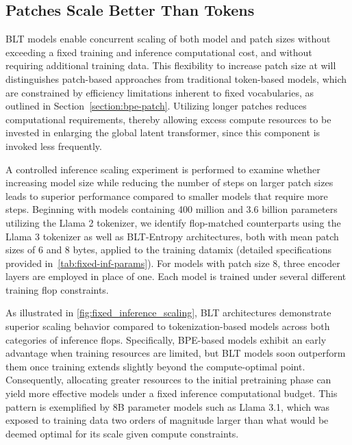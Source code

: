 \subsection{Patches Scale Better Than Tokens} {\textsc BLT} models enable concurrent scaling of both model and patch sizes without exceeding a fixed training and inference computational cost, and without requiring additional training data. This flexibility to increase patch size at will distinguishes patch-based approaches from traditional token-based models, which are constrained by efficiency limitations inherent to fixed vocabularies, as outlined in Section~\ref{section:bpe-patch}. Utilizing longer patches reduces computational requirements, thereby allowing excess compute resources to be invested in enlarging the global latent transformer, since this component is invoked less frequently.

A controlled inference scaling experiment is performed to examine whether increasing model size while reducing the number of steps on larger patch sizes leads to superior performance compared to smaller models that require more steps. Beginning with models containing 400 million and 3.6 billion parameters utilizing the Llama 2 tokenizer, we identify flop-matched counterparts using the Llama 3 tokenizer as well as {\textsc BLT}-Entropy architectures, both with mean patch sizes of 6 and 8 bytes, applied to the training datamix (detailed specifications provided in~\autoref{tab:fixed-inf-params}). For models with patch size 8, three encoder layers are employed in place of one. Each model is trained under several different training flop constraints.

As illustrated in \autoref{fig:fixed_inference_scaling}, {\textsc BLT} architectures demonstrate superior scaling behavior compared to tokenization-based models across both categories of inference flops. Specifically, BPE-based models exhibit an early advantage when training resources are limited, but {\textsc BLT} models soon outperform them once training extends slightly beyond the compute-optimal point. Consequently, allocating greater resources to the initial pretraining phase can yield more effective models under a fixed inference computational budget. This pattern is exemplified by 8B parameter models such as Llama 3.1, which was exposed to training data two orders of magnitude larger than what would be deemed optimal for its scale given compute constraints.

